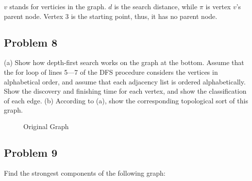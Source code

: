 \documentclass[a4paper]{article}
\makeatletter
\newenvironment{solution}
  {\begin{proof}[Solution]}
  {\end{proof}}
\renewenvironment{proof}[1][\proofname]{%
  \par\pushQED{\qed}\normalfont%
  \topsep6\p@\@plus6\p@\relax
  \trivlist\item[\hskip\labelsep\bfseries#1\@addpunct{.}]%
  \ignorespaces
}{%
  \popQED\endtrivlist\@endpefalse
}
\makeatother
\begin{document}
\begin{solution}
$v$ stands for verticies in the graph. $d$ is the search distance, while $\pi$ is vertex $v$'s parent node. Vertex 3 is the starting point, thus, it has no parent node.
\end{solution}

\subsection*{Problem 8}
(a) Show how depth-first search works on the graph at the bottom. Assume that the for loop of lines 5—7 of the DFS procedure considers the vertices in alphabetical order, and assume that each adjacency list is ordered alphabetically. Show the discovery and finishing time for each vertex, and show the classification of each edge. (b) According to (a), show the corresponding topological sort of this graph.
\begin{figure}[H]
\centering
{}
\caption{Original Graph}
\end{figure}

\begin{solution}
\end{solution}

\subsection*{Problem 9}
Find the strongest components of the following graph:
\begin{solution}
\end{solution}
\end{document}
